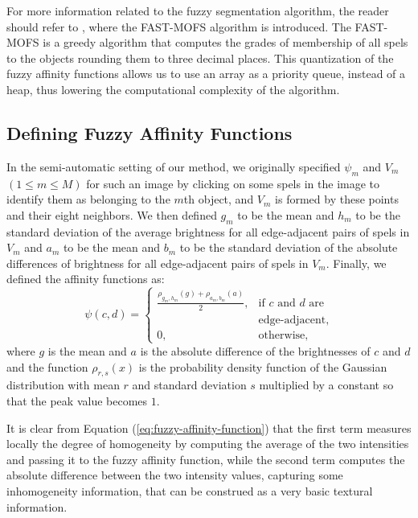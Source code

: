 \documentclass[10pt,twocolumn,letterpaper]{article}
\begin{document}
For more information related to the fuzzy segmentation algorithm, the reader should refer to \cite{CARV05a}, where the FAST-MOFS algorithm is introduced. The FAST-MOFS is a greedy algorithm that computes the grades of membership of all spels to the objects rounding them to three decimal places. This quantization of the fuzzy affinity functions allows us to use an array as a priority queue, instead of a heap, thus lowering the computational complexity of the algorithm.

\subsection{Defining Fuzzy Affinity Functions}
%
In the semi-automatic setting of our method, we originally specified $\psi _{m}$ and $V_{m}$ $(1\leq m\leq M)$ for such an image by clicking on some spels in the image to identify them as belonging to the $m$th object, and $V_{m}$ is formed by these points and their eight neighbors. We then defined $g_{m}$ to be the mean and $h_{m}$ to be the standard deviation of the average brightness for all edge-adjacent pairs of spels in $V_{m}$ and $a_{m}$ to be the mean and $b_{m}$ to be the standard deviation of the absolute differences of brightness for all edge-adjacent pairs of spels in $V_{m}$. Finally, we defined the affinity functions as:
\begin{equation}
\psi(c,d)= \left\{ \begin{array}{lr}  
\frac{\rho_{g_m , h_m}(g) + \rho_{a_m , b_m}(a)}{2}, & \text{if $c$ and $d$ are}\\
& \text{edge-adjacent}, \\ 
0, & \text{otherwise},
\end{array}  
\right.
\label{eq:fuzzy-affinity-function}
\end{equation}
where $g$ is the mean and $a$ is the absolute difference of the brightnesses of $c$ and $d$ and the function $\rho_{r,s}(x)$ is the probability density function of the Gaussian distribution with mean $r$ and standard deviation $s$ multiplied by a constant so that the peak value becomes $1$.

It is clear from Equation (\ref{eq:fuzzy-affinity-function}) that the first term measures locally the degree of homogeneity by computing the average of the two intensities and passing it to the fuzzy affinity function, while the second term computes the absolute difference between the two intensity values, capturing some inhomogeneity information, that can be construed as a very basic textural information. 
\end{document}
